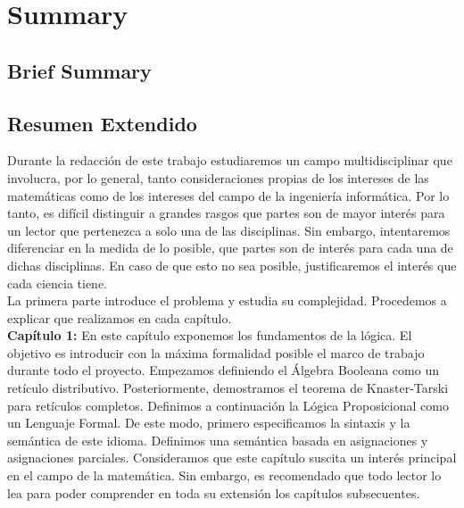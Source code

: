 
\newpage



\chapter*{Summary}
\section*{Brief Summary}



\section*{Resumen Extendido}

Durante la redacción de este trabajo estudiaremos un campo multidisciplinar que involucra, por lo general, tanto consideraciones propias de los intereses de las matemáticas como de los intereses del campo de la ingeniería informática. Por lo tanto, es difícil distinguir a grandes rasgos que partes son de mayor interés para un lector que pertenezca a solo una de las disciplinas. Sin embargo, intentaremos diferenciar en la medida de lo posible, que partes son de interés para cada una de dichas disciplinas. En caso de que esto no sea posible, justificaremos el interés que cada ciencia tiene.\\

La primera parte introduce el problema y estudia su complejidad. Procedemos a explicar que realizamos en cada capítulo.\\

\textbf{Capítulo 1:} En este capítulo exponemos los fundamentos de la lógica. El objetivo es introducir con la máxima formalidad posible el marco de trabajo durante todo el proyecto. 
Empezamos definiendo el Álgebra Booleana como un retículo distributivo. Posteriormente, demostramos el teorema de Knaster-Tarski para retículos completos. Definimos a continuación la Lógica Proposicional como un Lenguaje Formal. De este modo, primero especificamos la sintaxis y la semántica de este idioma. Definimos una semántica basada en asignaciones y asignaciones parciales. Consideramos que este capítulo suscita un interés principal en el campo de la matemática. Sin embargo, es recomendado que todo lector lo lea para poder comprender en toda su extensión los capítulos subsecuentes.\\

